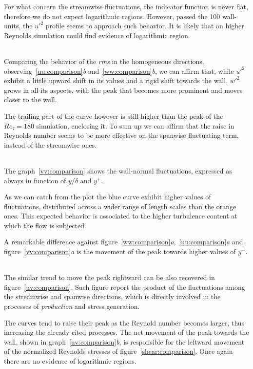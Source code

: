 For what concern the streamwise fluctuations, the indicator function is never flat, therefore we do not expect logarithmic regions. However, passed the 100 wall-units, the $u'^{2}$ profile seems to approach such behavior. It is likely that an higher Reynolds simulation could find evidence of logarithmic region.\\~\par

Comparing the behavior of the \emph{rms} in the homogeneous directions, observing~\ref{uu:comparison}\emph{b} and~\ref{ww:comparison}\emph{b}, we can affirm that, while $u'^{2}$ exhibit a little upward shift in its values and a rigid shift towards the wall, $w'^{2}$ grows in all its aspects, with the peak that becomes more prominent and moves closer to the wall. \par
The trailing part of the curve however is still higher than the peak of the $Re_{\tau}=180$ simulation, enclosing it. To sum up we can affirm that the raise in Reynolds number seems to be more effective on the spanwise fluctuating term, instead of the streamwise ones.\\~\par


The graph~\ref{vv:comparison} shows the wall-normal fluctuations, expressed as always in function of $y/\delta$ and $y^{+}$.\par
As we can catch from the plot the blue curve exhibit higher values of fluctuations, distributed across a wider range of length scales than the orange ones. This expected behavior is associated to the higher turbulence content at which the flow is subjected. \par
A remarkable difference against figure~\ref{ww:comparison}\emph{a},~\ref{uu:comparison}\emph{a} and figure~\ref{vv:comparison}\emph{a} is the movement of the peak towards higher values of $y^{+}$. \\~\par

The similar trend to move the peak rightward can be also recovered in figure~\ref{uv:comparison}. Such figure report the product of the fluctuations among the streamwise and spanwise directions, which is directly involved in the processes of \emph{production} and stress generation.\par
The curves tend to raise their peak as the Reynold number becomes larger, thus increasing the already cited processes. The net movement of the peak towards the wall, shown in graph~\ref{uv:comparison}\emph{b}, is responsible for the leftward movement of the normalized Reynolds stresses of figure~\ref{shear:comparison}.
Once again there are no evidence of logarithmic regions. \\~\par

